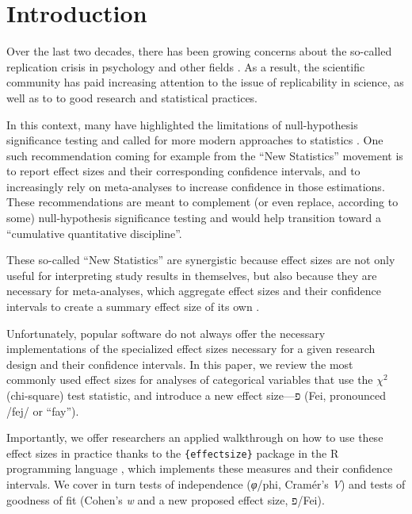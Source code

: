 \documentclass[mathematics,article,submit,moreauthors,pdftex]{mdpi}
\begin{document}

\hypertarget{introduction}{%
\section{Introduction}\label{introduction}}

Over the last two decades, there has been growing concerns about the
so-called replication crisis in psychology and other fields
\citep{OSC2015estimating, camerer2018evaluating}. As a result, the
scientific community has paid increasing attention to the issue of
replicability in science, as well as to to good research and statistical
practices.

In this context, many have highlighted the limitations of
null-hypothesis significance testing and called for more modern
approaches to statistics \citep{cumming2014new}. One such recommendation
coming for example from the ``New Statistics'' movement is to report
effect sizes and their corresponding confidence intervals, and to
increasingly rely on meta-analyses to increase confidence in those
estimations. These recommendations are meant to complement (or even
replace, according to some) null-hypothesis significance testing and
would help transition toward a ``cumulative quantitative discipline''.

These so-called ``New Statistics'' are synergistic because effect sizes
are not only useful for interpreting study results in themselves, but
also because they are necessary for meta-analyses, which aggregate
effect sizes and their confidence intervals to create a summary effect
size of its own \citep[\citet{wiernik2020unbiased}]{degeest2010impact}.

Unfortunately, popular software do not always offer the necessary
implementations of the specialized effect sizes necessary for a given
research design and their confidence intervals. In this paper, we review
the most commonly used effect sizes for analyses of categorical
variables that use the \(\chi^2\) (chi-square) test statistic, and
introduce a new effect size---פ (Fei, pronounced /fej/ or ``fay'').

Importantly, we offer researchers an applied walkthrough on how to use
these effect sizes in practice thanks to the \texttt{\{effectsize\}}
package \citep{benshachar2020effectsize} in the R programming language
\citep{base2023}, which implements these measures and their confidence
intervals. We cover in turn tests of independence (\emph{φ}/phi,
Cramér's \emph{V}) and tests of goodness of fit (Cohen's \emph{w} and a
new proposed effect size, פ/Fei).
\end{document}
